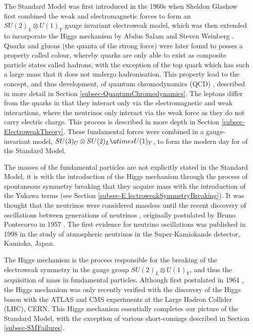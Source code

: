 The Standard Model was first introduced in the 1960s when Sheldon Glashow first combined the weak and electromagnetic forces \cite{
Glashow:1961tr} to form an $SU(2)_L \otimes U(1)_Y$ gauge invariant electroweak model, which was then extended to incorporate the Higgs 
mechanism by Abdus Salam and Steven Weinberg \cite{PhysRevLett.19.1264, Salam:1959zz}. Quarks and gluons (the quanta of the strong force) were 
later found to posses a property called colour, whereby quarks are only able to exist as composite particle states called hadrons, with the 
exception of the top quark which has such a large mass that it does not undergo hadronisation. This property lead to the concept, and thus 
development, of quantum chromodynamics (QCD) \cite{GellMann:1964nj,PhysRevD.8.3633, PhysRevLett.30.1346}, described in more detail in Section 
\ref{subsec-QuantumChromodynamics}. The leptons differ from the quarks in that they interact only via the electromagnetic and weak 
interactions, where the neutrinos only interact via the weak force as they do not carry electric charge. This process is described in more 
depth in Section \ref{subsec-ElectroweakTheory}. These fundamental forces were combined in a gauge-invariant model, $SU(3)_C \otimes SU(2)_L \o
times U(1)_Y$, to form the modern day for of the Standard Model. 

The masses of the fundamental particles are not explicitly stated in the Standard Model, it is with the introduction of the Higgs mechanism 
through the process of spontaneous symmetry breaking that they acquire mass with the introduction of the Yukawa terms (see Section \ref{subsec-E
lectroweakSymmetryBreaking}). It was thought that the neutrinos were considered massless until the recent discovery of oscillations between 
generations of neutrinos \cite{PhysRevLett.81.1562}, originally postulated by Bruno Pontecorvo in 1957 \cite{Pontecorvo:1967fh}. The first 
evidence for neutrino oscillations was published in 1998 in the study of atmospheric neutrinos in the Super-Kamiokande detector, Kamioka, 
Japan. 

The Higgs mechanism is the process responsible for the breaking of the electroweak symmetry in the gauge group $SU(2)_L \otimes U(1)_Y$, and 
thus the acquisition of mass in fundamental particles. Although first postulated in 1964 \cite{PhysRevLett.13.508, PhysRevLett.13.321, 
PhysRevLett.13.585}, the Higgs mechanism was only recently verified with the discovery of the Higgs boson with the ATLAS \cite{Aad:2012tfa} and 
CMS \cite{b846af59f42d440a9058d93ed5df44cf} experiments at the Large Hadron Collider (LHC), CERN. This Higgs mechanism essentially completes 
our picture of the Standard Model, with the exception of various short-comings described in Section \ref{subsec-SMFailures}.


